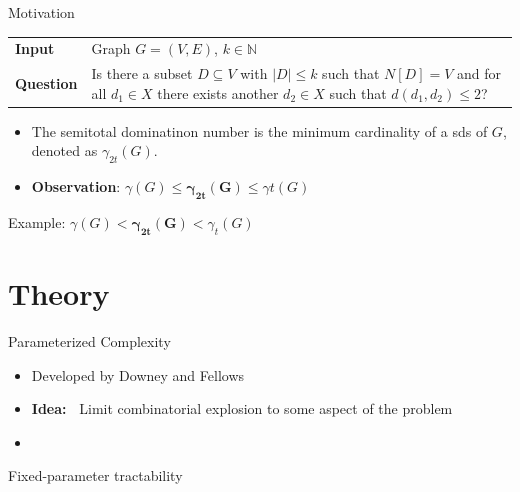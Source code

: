 \begin{frame}[c]{Motivation}
\begin{tcolorbox}[colback=TUMBlueLighter,title=\sdom]
    \begin{tabularx}{1.0\textwidth}{>{\hsize=0.30\hsize}X>{\hsize=0.8\hsize}X}
        \textbf{Input}    & Graph $G = (V, E)$, $k \in \mathbb{N}$\\
    \textbf{Question} & Is there a subset $D \subseteq V$ with $|D| \leq k$ such that ${N[D] = V}$ and for all $d_1 \in X$ there exists another $d_2 \in X$ such that ${d(d_1, d_2) \leq 2}$?
    \end{tabularx}
\end{tcolorbox}

\begin{itemize}
    \item The semitotal dominatinon number is the minimum cardinality of a sds of $G$, denoted as $\gamma_{2t}(G)$.
    \item \textbf{Observation}: $\gamma(G) \leq  \mathbf{\gamma_{2t}(G)}  \leq \gamma{t}(G)$
\end{itemize}
\end{frame}

\begin{frame}[c]{Example: $\gamma(G) < \mathbf{\gamma_{2t}(G)} < \gamma_t(G)$}
\begin{figure}[!ht]
    \end{figure}
\end{frame}


\section{Theory}
\begin{frame}[c]{Parameterized Complexity}
    \begin{itemize}
        \item Developed by Downey and Fellows \\
        \item \textbf{Idea:~} Limit combinatorial explosion to some aspect of the problem\\
        \item 
    \end{itemize}

\end{frame}

\begin{frame}[c]{Fixed-parameter tractability}

\end{frame}

